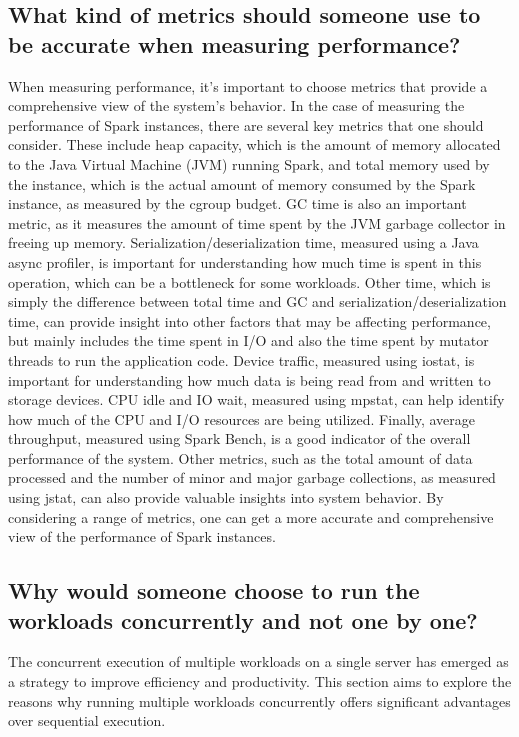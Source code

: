 \subsection{What kind of metrics should someone use to be
accurate when measuring performance?} When measuring performance, it's
important to choose metrics that provide a comprehensive view of the
system's behavior. In the case of measuring the performance of Spark
instances, there are several key metrics that one should consider.
These include heap capacity, which is the amount of memory allocated
to the Java Virtual Machine (JVM) running Spark, and total memory used
by the instance, which is the actual amount of memory consumed by the
Spark instance, as measured by the cgroup budget. GC time is also an
important metric, as it measures the amount of time spent by the JVM
garbage collector in freeing up memory. Serialization/deserialization
time, measured using a Java async profiler, is important for
understanding how much time is spent in this operation, which can be a
bottleneck for some workloads. Other time, which is simply the
difference between total time and GC and serialization/deserialization
time, can provide insight into other factors that may be affecting
performance, but mainly includes the time spent in I/O and also the
time spent by mutator threads to run the application code. Device
traffic, measured using iostat, is important for understanding how
much data is being read from and written to storage devices. CPU idle
and IO wait, measured using mpstat, can help identify how much of the
CPU and I/O resources are being utilized. Finally, average throughput,
measured using Spark Bench, is a good indicator of the overall
performance of the system. Other metrics, such as the total amount of
data processed and the number of minor and major garbage collections,
as measured using jstat, can also provide valuable insights into
system behavior. By considering a range of metrics, one can get a more
accurate and comprehensive view of the performance of Spark instances.

\subsection{Why would someone choose to run the workloads
concurrently and not one by one?} The concurrent
execution of multiple workloads on a single server has emerged
as a strategy to improve efficiency and productivity. This section
aims to explore the reasons why running multiple workloads
concurrently offers significant advantages over sequential execution.

